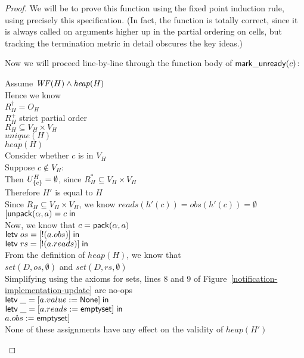 \begin{proof}
We will be to prove this function using the fixed point induction
rule, using precisely this specification. (In fact, the function is
totally correct, since it is always called on arguments higher up in
the partial ordering on cells, but tracking the termination metric in
detail obscures the key ideas.)

Now we will proceed line-by-line through the function body of $\mathsf{mark\_unready}(c)$: 

\begin{tabbedproof}
\oo Assume $\mathit{WF}(H) \land \mathit{heap}(H)$ \\
\oo Hence we know \\
\oox $R^\dagger_H = O_H$ \\
\oox $R^+_H$ strict partial order \\
\oox $R_H \subseteq V_H \times V_H$ \\
\oox $\mathit{unique}(H)$ \\
\oox $\mathit{heap}(H)$ \\
\ooo Consider whether $c$ is in $V_H$ \\
\ooo Suppose $c \not\in V_H$: \\
\oooo Then $U^H_{\{{c}\}} = \emptyset$, since $R^*_H \subseteq V_H \times V_H$ \\ 
\oooo Therefore $H'$ is equal to $H$ \\
\oooo Since $R_H \subseteq V_H \times V_H$, we know $\mathit{reads}(h'(c)) = \mathit{obs}(h'(c)) = \emptyset$ \\
\oooo $[\mathsf{unpack}({\alpha}, {a}) = {c} \;\mathsf{in}\;{}$ \\
\oooo Now, we know that $c = \mathsf{pack}({\alpha}, {a})$ \\
\oooo $\mathsf{letv}\;os = [!(a.obs)]\;\mathsf{in}\;$ \\
\oooo $\mathsf{letv}\;rs = [!(a.reads)]\;\mathsf{in}\;$ \\
\oooo From the definition of $\mathit{heap}(H)$, we know that  \\
\oooo $\mathit{set}(D, os, \emptyset)$ and $\mathit{set}(D, rs, \emptyset)$ \\
\oooo Simplifying using the axioms for sets, lines 8 and 9 of Figure~\ref{notification-implementation-update} are no-ops \\
\oooo $\mathsf{letv}\;\_ = [a.value := \mathsf{None}]\;\mathsf{in}\;$ \\
\oooo $\mathsf{letv}\;\_ = [a.reads := \mathsf{emptyset}]\;\mathsf{in}\;$ \\
\oooo $a.obs := \mathsf{emptyset}]$ \\
\oooo None of these assignments have any effect on the validity of $\mathit{heap}(H')$ \\

\end{tabbedproof}
\end{proof}
